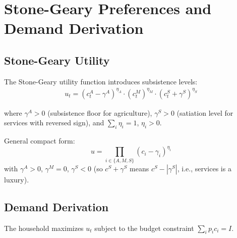 \documentclass[a4paper,11pt]{article}
\begin{document}
\clearpage

\section{Stone-Geary Preferences and Demand Derivation}

\subsection*{Stone-Geary Utility}

The Stone-Geary utility function introduces subsistence levels:
\begin{align*}
u_t = (c_t^A - \gamma^A)^{\eta_A} \cdot (c_t^M)^{\eta_M} \cdot (c_t^S + \gamma^S)^{\eta_S}
\tag{Stone-Geary}
\end{align*}

\noindent where $\gamma^A > 0$ (subsistence floor for agriculture), $\gamma^S > 0$ (satiation level for services with reversed sign), and $\sum_{i} \eta_i = 1$, $\eta_i > 0$.

General compact form:
\[
u = \prod_{i \in \{A,M,S\}} (c_i - \gamma_i)^{\eta_i}
\]
with $\gamma^A > 0$, $\gamma^M = 0$, $\gamma^S < 0$ (so $c^S + \gamma^S$ means $c^S - |\gamma^S|$, i.e., services is a luxury).

\subsection*{Demand Derivation}

The household maximizes $u_t$ subject to the budget constraint $\sum_i p_i c_i = I$.
\end{document}
